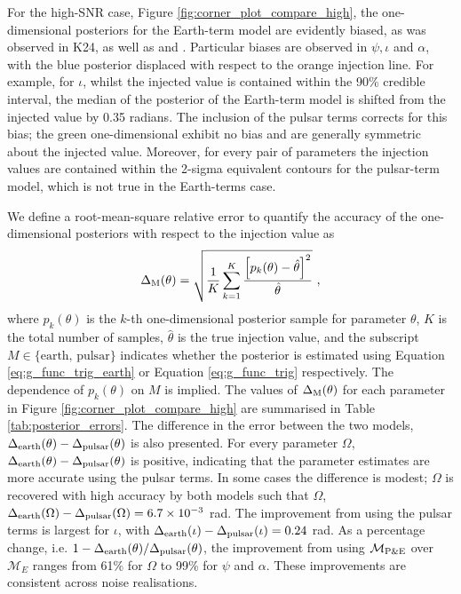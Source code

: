 \documentclass[fleqn,usenatbib,useAMS]{mnras}
\begin{document}
For the high-SNR case, Figure \ref{fig:corner_plot_compare_high}, the one-dimensional posteriors for the Earth-term model are evidently biased, as was observed in K24, as well as \cite{Zhupulsarterms} and \cite{Chen2022}. Particular biases are observed in $\psi, \iota $ and $\alpha$, with the blue posterior displaced with respect to the orange injection line. For example, for $\iota$, whilst the injected value is contained within the 90\% credible interval, the median of the posterior of the Earth-term model is shifted from the injected value by 0.35 radians. The inclusion of the pulsar terms corrects for this bias; the green one-dimensional exhibit no bias and are generally symmetric about the injected value. Moreover, for every pair of parameters the injection values are contained within the 2-sigma equivalent contours for the pulsar-term model, which is not true in the Earth-terms case. \newline 


We define a root-mean-square relative error to quantify the accuracy of the one-dimensional posteriors with respect to the injection value as
\begin{equation}
\Delta_{\rm M}(\theta) = \sqrt{\frac{1}{K}\sum_{k=1}^{K} \frac{ \left[p_k(\theta) - \hat{\theta}\right]^2}{\hat{\theta}}} \ , \label{eq:mean_rel_error}
\end{equation}
where $p_k(\theta)$ is the $k$-th one-dimensional posterior sample for parameter $\theta$, $K$ is the total number of samples, $\hat{\theta}$ is the true injection value, and the subscript $M \in \{ \text{earth, pulsar} \}$ indicates whether the posterior is estimated using Equation \eqref{eq:g_func_trig_earth} or Equation \eqref{eq:g_func_trig} respectively. The dependence of $p_k(\theta)$ on $M$ is implied. The values of $\Delta_{\rm M}(\theta)$ for each parameter in Figure \ref{fig:corner_plot_compare_high} are summarised in Table \ref{tab:posterior_errors}. The difference in the error between the two models, $\Delta_{\rm earth}(\theta)-\Delta_{\rm pulsar}(\theta)$ is also presented. For every parameter $\Omega$, $\Delta_{\rm earth}(\theta)-\Delta_{\rm pulsar}(\theta)$ is positive, indicating that the parameter estimates are more accurate using the pulsar terms. In some cases the difference is modest;  $\Omega$ is recovered with high accuracy by both models such that $\Omega$, $\Delta_{\rm earth}(\Omega)-\Delta_{\rm pulsar}(\Omega) = 6.7 \times 10^{-3}$ rad. The improvement from using the pulsar terms is largest for $\iota$, with $\Delta_{\rm earth}(\iota) - \Delta_{\rm pulsar}(\iota)  = 0.24$ rad. As a percentage change, i.e. $1 - \Delta_{\rm earth}(\theta)/\Delta_{\rm pulsar}(\theta)$, the improvement from using $\mathcal{M}_{\rm P \& E}$ over $\mathcal{M}_{E}$ ranges from 61\% for $\Omega$ to 99\% for $\psi$ and $\alpha$. These improvements are consistent across noise realisations. \newline 
\end{document}
